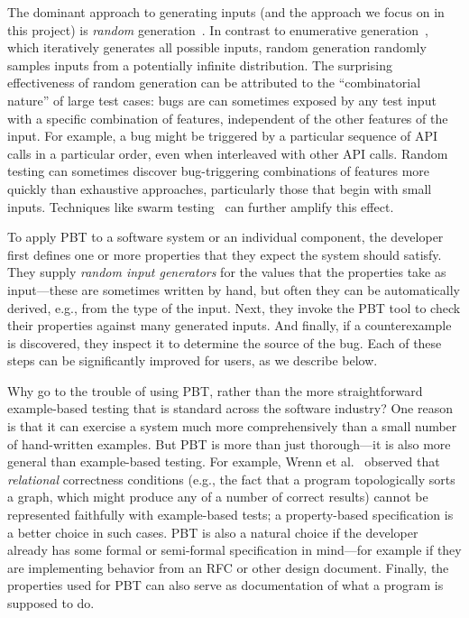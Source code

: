 The dominant approach to generating inputs (and the approach we focus on in this
project) is {\em random}
generation~\cite{hamlet1994random}. In contrast to enumerative
generation~\cite{DBLP:conf/haskell/RuncimanNL08, leancheck}, which iteratively
generates all possible inputs, random generation randomly samples inputs from a
potentially infinite distribution. The
surprising effectiveness of random generation can be attributed to the
``combinatorial nature'' of large test cases: bugs are
can sometimes exposed by any test input with a specific combination
of features, independent of the other features of the input. For example, a bug might be triggered by a particular
sequence of API calls in a particular order, even when
interleaved with other API calls. Random testing can sometimes
discover bug-triggering combinations of features more quickly than
exhaustive approaches, particularly those that begin with small inputs. Techniques like swarm
testing~\cite{groce2012swarm} can further amplify this effect.

\smallskip

To apply PBT to a software system or an individual component, the
developer first defines one or more properties that they expect the
system should satisfy.  They supply {\em random input generators} for
the values that the properties take as input---these are sometimes
written by hand, but often they can be automatically derived, e.g.,
from the type of the input. Next, they invoke the PBT tool to check
their properties against many generated inputs. And finally, if a
counterexample is discovered, they inspect it to determine the source
of the bug.  Each of these steps can be significantly improved for
users, as we describe below.

Why go to the trouble of using PBT, rather than the more straightforward
example-based testing that is standard across the software industry?
One reason is that it can exercise a system much more
comprehensively than a small number of hand-written examples.
But
PBT is more than just thorough---it is also more general than example-based
testing. For example, Wrenn et al.~\cite{wrenn2021using} observed that
{\em relational} correctness conditions (e.g., the fact that a program
topologically sorts a graph, which might
produce any of a number of correct results) cannot be represented
faithfully with example-based tests; a property-based specification is
a better choice in such cases.
%
PBT is also
a natural choice if
the developer already has some formal or semi-formal
specification in mind---for example if they are implementing behavior from an RFC or
other design document.
Finally, the
properties used for PBT can also serve as documentation of what a
program is supposed to do.

